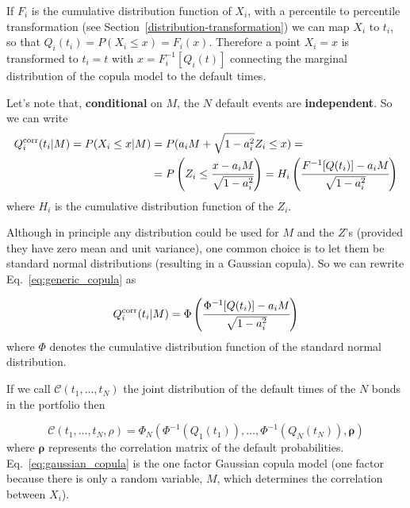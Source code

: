 If $F_i$ is the cumulative distribution function of $X_i$, with a percentile to percentile transformation (see Section~\ref{distribution-transformation}) we can map \(X_i\) to \(t_i\), so that $Q_i(t_i) = P(X_i\le x)=F_i(x)$. Therefore a point \(X_i = x\) is transformed to \(t_i = t\) with \(x = F_i^{-1}[Q_i(t)]\) connecting the marginal distribution of the copula model to the default times.

Let's note that, \textbf{conditional} on $M$, the $N$ default events are \textbf{independent}. So we can write
\begin{equation}
\begin{split}
Q_i^{\textrm{corr}}(t_i|M) = P(X_i\le x|M) &= P(a_i M + \sqrt{1-a_i^2}Z_i\le x) =\\
&= P\left(Z_i\le \cfrac{x-a_i M}{\sqrt{1-a_i^2}}\right)
=H_i\left(\cfrac{F^{-1}[Q(t_i)]-a_i M}{\sqrt{1-a_i^2}}\right)
\end{split}
\label{eq:generic_copula}
\end{equation}
where $H_i$ is the cumulative distribution function of the $Z_i$.

Although in principle any distribution could be used for \(M\) and the \(Z\)'s (provided they have zero mean and unit variance), one common choice is to let them be standard normal distributions (resulting in a Gaussian copula).
So we can rewrite Eq.~\ref{eq:generic_copula} as

\begin{equation}
Q_i^{\textrm{corr}}(t_i|M) = \Phi\left(\cfrac{\Phi^{-1}[Q(t_i)]-a_i M}{\sqrt{1-a_i^2}}\right)
\label{eq:gaussian_one_factor_copula}
\end{equation}
where $\Phi$ denotes the cumulative distribution function of the standard normal distribution.

If we call $\mathcal{C}(t_1,\ldots,t_N)$ the joint distribution of the default times of the $N$ bonds in the portfolio then

\begin{equation}
\mathcal{C}(t_1,\ldots,t_N, \rho)=\Phi_{N}(\Phi^{-1}(Q_1(t_1)),\ldots,\Phi^{-1}(Q_N(t_N)), \boldsymbol{\rho})
\label{eq:gaussian_copula}
\end{equation}
where $\boldsymbol{\rho}$ represents the correlation matrix of the default probabilities. Eq.~\ref{eq:gaussian_copula} is the one factor Gaussian copula model (one factor because there is only a random variable, $M$, which determines the correlation between $X_i$).

